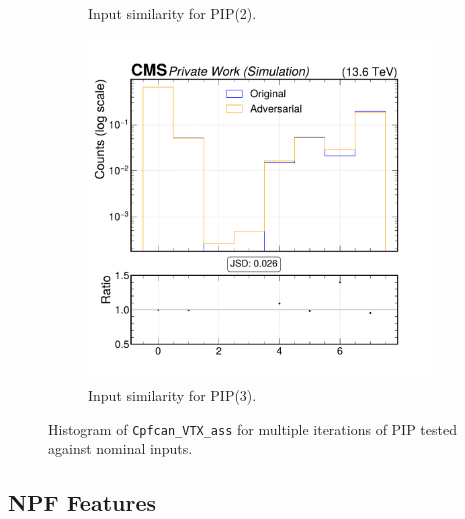 \begin{figure}[h]
\begin{subfigure}[t]{0.32\textwidth}
    \caption{Input similarity for PIP(2).}
  \end{subfigure}\hfill
  \begin{subfigure}[t]{0.32\textwidth}
    \includegraphics[width=\linewidth]{media/output/features/compare/intprob_3/cmp_cpf_arr_Cpfcan_VTX_ass.pdf}
    \caption{Input similarity for PIP(3).}
  \end{subfigure}

  \caption{Histogram of \texttt{Cpfcan\_VTX\_ass} for multiple iterations of PIP tested against nominal inputs.}
  \label{fig:intprob_input_Cpfcan_VTX_ass}
\end{figure}

\newpage
\subsection*{NPF Features}

